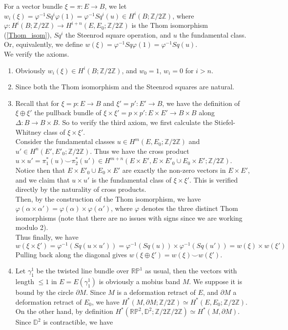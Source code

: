 	\begin{const} \label{Cons_SW}
		For a vector bundle $\xi=\pi:E\to B$, we let $w_i(\xi)=\varphi^{-1}Sq^i\varphi(1)=\varphi^{-1}Sq^i(u)\in H^i(B;\mathbb{Z}/2\mathbb{Z})$, where $\varphi:H^i(B;\mathbb{Z}/2\mathbb{Z})\to H^{i+n}(E,E_0;\mathbb{Z}/2\mathbb{Z})$ is the Thom isomorphism (\cref{Thom_isom}), $Sq^i$ the Steenrod square operation, and $u$ the fundamental class. Or, equivalently, we define $w(\xi)=\varphi^{-1}Sq\varphi(1)=\varphi^{-1}Sq(u)$. \\
		We verify the axioms. 
		\begin{enumerate}
			\item Obviously $w_i(\xi)\in H^i(B;\mathbb{Z}/2\mathbb{Z})$, and $w_0=1$, $w_i=0$ for $i>n$. 
			\item Since both the Thom isomorphism and the Steenrod squares are natural. 
			\item Recall that for $\xi=p:E\to B$ and $\xi'=p':E'\to B$, we have the definition of $\xi\oplus\xi'$ the pullback bundle of $\xi\times\xi'=p\times p':E\times E'\to B\times B$ along $\Delta:B\to B\times B$. So to verify the third axiom, we first calculate the Stiefel-Whitney class of $\xi\times\xi'$. \\
			Consider the fundamental classes $u\in H^m(E,E_0;\mathbb{Z}/2\mathbb{Z})$ and $u'\in H^n(E',E'_0;\mathbb{Z}/2\mathbb{Z})$. Thus we have the cross product $u\times u'=\pi_1^*(u)\smile \pi_2^*(u')\in H^{m+n}(E\times E',E\times E'_0\cup E_0\times E';\mathbb{Z}/2\mathbb{Z})$. Notice then that $E\times E'_0\cup E_0\times E'$ are exactly the non-zero vectors in $E\times E'$, and we claim that $u\times u'$ is the fundamental class of $\xi\times\xi'$. This is verified directly by the naturality of cross products. \\
			Then, by the construction of the Thom isomorphism, we have $\varphi(\alpha\times\alpha')=\varphi(\alpha)\times\varphi(\alpha')$, where $\varphi$ denotes the three distinct Thom isomorphisms (note that there are no issues with signs since we are working modulo 2). \\
			Thus finally, we have
			\[ w(\xi\times\xi')=\varphi^{-1}(Sq(u\times u'))=\varphi^{-1}(Sq(u))\times\varphi^{-1}(Sq(u'))=w(\xi)\times w(\xi') \]
			Pulling back along the diagonal gives $w(\xi\oplus\xi')=w(\xi)\smile w(\xi')$. 
			\item Let $\gamma_1^1$ be the twisted line bundle over $\mathbb{RP}^1$ as usual, then the vectors with length $\le 1$ in $E=E(\gamma_1^1)$ is obviously a mobius band $M$. We suppose it is bound by the circle $\partial M$. Since $M$ is a deformation retract of $E$, and $\partial M$ a deformation retract of $E_0$, we have $H^*(M,\partial M;\mathbb{Z}/2\mathbb{Z})\simeq H^*(E,E_0;\mathbb{Z}/2\mathbb{Z})$. On the other hand, by definition $H^*(\mathbb{RP}^2,\mathbb{D}^2;\mathbb{Z}/2\mathbb{Z}/2\mathbb{Z})\simeq H^*(M,\partial M)$. Since $\mathbb{D}^2$ is contractible, we have \\

\end{enumerate}
\end{const}
